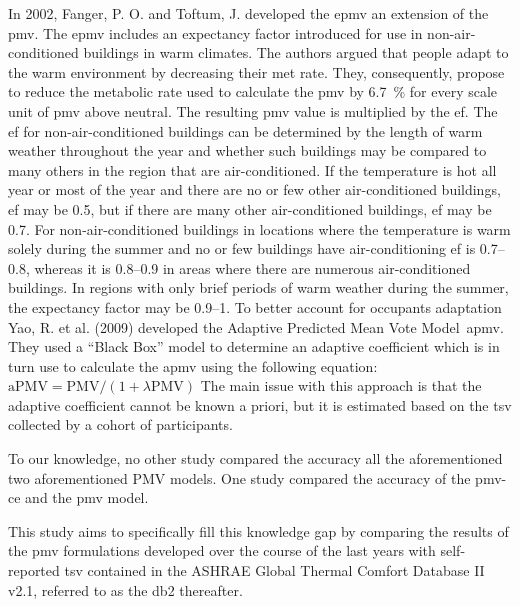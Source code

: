 In 2002, Fanger, P. O. and Toftum, J. developed the \gls{epmv} an extension of the \ac{pmv}.
The \gls{epmv} includes an expectancy factor introduced for use in non-air-conditioned buildings in warm climates.
The authors argued that people adapt to the warm environment by decreasing their \ac{met} rate.
They, consequently, propose to reduce the metabolic rate used to calculate the \ac{pmv} by \qty{6.7}{\percent} for every scale unit of \ac{pmv} above neutral.
The resulting \ac{pmv} value is multiplied by the \ac{ef}.
The \ac{ef} for non-air-conditioned buildings can be determined by the length of warm weather throughout the year and whether such buildings may be compared to many others in the region that are air-conditioned.
If the temperature is hot all year or most of the year and there are no or few other air-conditioned buildings, \ac{ef} may be \num{0.5}, but if there are many other air-conditioned buildings, \ac{ef} may be \num{0.7}.
For non-air-conditioned buildings in locations where the temperature is warm solely during the summer and no or few buildings have air-conditioning \ac{ef} is \numrange{0.7}{0.8}, whereas it is \numrange{0.8}{.9} in areas where there are numerous air-conditioned buildings.
In regions with only brief periods of warm weather during the summer, the expectancy factor may be \numrange{0.9}{1}.
To better account for occupants adaptation Yao, R. et al. (2009) developed the Adaptive Predicted Mean
 Vote Model~\gls{apmv}.
They used a ``Black Box'' model to determine an adaptive coefficient which is in turn use to calculate the \gls{apmv} using the following equation: $\mathrm{aPMV} = \mathrm{PMV}/(1+\lambda \mathrm{PMV})$
The main issue with this approach is that the adaptive coefficient cannot be known a priori, but it is estimated based on the \ac{tsv} collected by a cohort of participants.

To our knowledge, no other study compared the accuracy all the aforementioned two aforementioned PMV models.
One study compared the accuracy of the \gls{pmv-ce} and the \ac{pmv} model.

This study aims to specifically fill this knowledge gap by comparing the results of the \ac{pmv} formulations developed over the course of the last years with self-reported \ac{tsv} contained in the ASHRAE Global Thermal Comfort Database II v2.1, referred to as the \gls{db2} thereafter.


